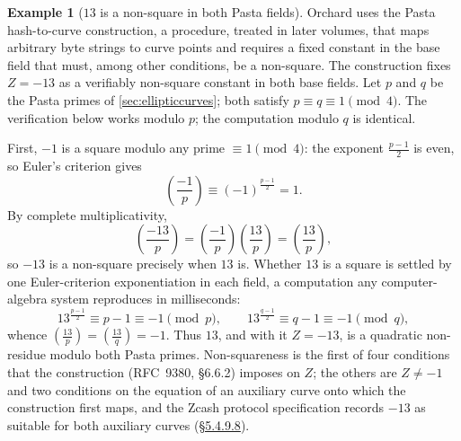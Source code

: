 \documentclass[11pt,a4paper]{article}
\theoremstyle{definition}
\newtheorem{example}[theorem]{Example}
\theoremstyle{remark}
\newcommand{\legendre}[2]{\left(\frac{#1}{#2}\right)}
\begin{document}
\begin{example}[\(13\) is a non-square in both Pasta fields]
\label{numbertheory:ex:pasta-nonsquare}
Orchard uses the Pasta hash-to-curve construction, a procedure, treated
in later volumes, that maps arbitrary byte strings to curve points and
requires a fixed constant in the base field that must, among other
conditions, be a non-square. The construction fixes \(Z = -13\) as a
verifiably non-square constant in both base fields. Let \(p\) and \(q\)
be the Pasta primes of \cref{sec:ellipticcurves}; both satisfy
\(p \equiv q \equiv 1 \pmod{4}\). The verification below works modulo
\(p\); the computation modulo \(q\) is identical.

First, \(-1\) is a square modulo any prime \(\equiv 1 \pmod 4\): the
exponent \(\tfrac{p-1}{2}\) is even, so Euler's criterion gives
\[
\legendre{-1}{p} \equiv (-1)^{\frac{p-1}{2}} = 1 .
\]
By complete multiplicativity,
\[
\legendre{-13}{p} = \legendre{-1}{p}\legendre{13}{p}
= \legendre{13}{p},
\]
so \(-13\) is a non-square precisely when \(13\) is. Whether \(13\) is a
square is settled by one Euler-criterion exponentiation in each field, a
computation any computer-algebra system reproduces in milliseconds:
\[
13^{\frac{p-1}{2}} \equiv p - 1 \equiv -1 \pmod{p},
\qquad
13^{\frac{q-1}{2}} \equiv q - 1 \equiv -1 \pmod{q},
\]
whence \(\legendre{13}{p} = \legendre{13}{q} = -1\). Thus \(13\), and
with it \(Z = -13\), is a quadratic non-residue modulo both Pasta
primes. Non-squareness is the first of four conditions that the
construction (RFC~9380, \S6.6.2) imposes on \(Z\); the others are
\(Z \neq -1\) and two conditions on the equation of an auxiliary curve
onto which the construction first maps, and the Zcash protocol
specification records \(-13\) as suitable for both auxiliary curves
(\href{https://zips.z.cash/protocol/protocol.pdf\#concretegrouphashpallasandvesta}{\S5.4.9.8}).
\end{example}
\end{document}
